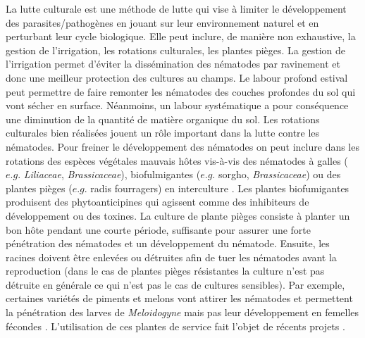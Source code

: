 	La lutte culturale est une méthode de lutte  qui vise à limiter le développement des parasites/pathogènes  en jouant sur leur environnement naturel et en perturbant leur cycle biologique. Elle peut inclure, de manière non exhaustive,  la gestion de l'irrigation, les rotations culturales, les plantes pièges.
La gestion de l'irrigation permet d'éviter la dissémination des nématodes par ravinement et donc une meilleur protection des cultures au champs. Le labour  profond estival peut
permettre de faire remonter les  nématodes des couches profondes du sol qui vont
sécher en surface. Néanmoins, un labour systématique a pour conséquence une diminution de la quantité de matière organique du sol.
Les rotations culturales bien réalisées jouent un rôle important dans la lutte contre les nématodes. 
Pour freiner le développement des nématodes on peut inclure dans les rotations des espèces végétales
mauvais hôtes vis-à-vis des nématodes à galles ($e.g.$ \textit{Liliaceae}, \textit{Brassicaceae}),  biofulmigantes ($e.g.$ sorgho,  \textit{Brassicaceae}) ou des  plantes pièges ($e.g.$ radis fourragers) en interculture \citep{Djian-Caporalino2019}. 
Les  plantes biofumigantes  produisent des phytoanticipines qui agissent comme
des inhibiteurs de développement ou des toxines. La culture de plante pièges consiste à planter un bon hôte pendant une courte période, suffisante pour assurer une forte pénétration des nématodes et un développement du nématode.  Ensuite, les racines doivent être enlevées ou détruites afin de tuer les nématodes avant la reproduction (dans le cas de plantes pièges résistantes la culture n'est pas détruite en générale ce qui n'est pas le cas de cultures sensibles). Par exemple,  certaines variétés de piments et melons 
  vont  attirer les  nématodes  et permettent la pénétration des larves de \textit{Meloidogyne} mais pas leur développement en femelles fécondes \citep{Berge1974, Djian-Caporalino2008}. L'utilisation de ces plantes de service fait l'objet de récents projets \citep{Djian-Caporalino2019}.
	
	




